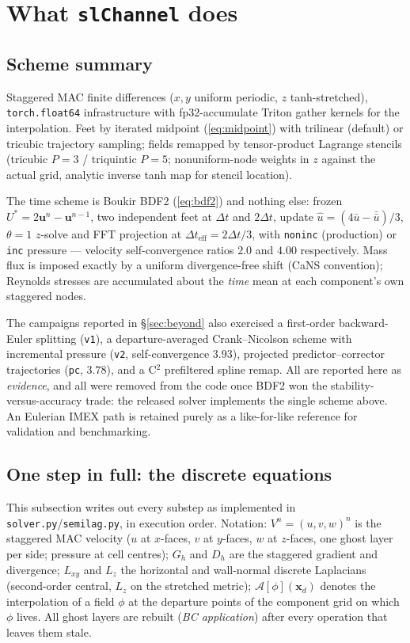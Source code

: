 \documentclass[11pt,a4paper]{article}
\newcommand{\bu}{\mathbf{u}}
\newcommand{\bx}{\mathbf{x}}
\begin{document}
\section{What \texttt{slChannel} does}

\subsection{Scheme summary}

Staggered MAC finite differences ($x,y$ uniform periodic, $z$
tanh-stretched), \texttt{torch.float64} infrastructure with fp32-accumulate
Triton gather kernels for the interpolation. Feet by iterated midpoint
(\ref{eq:midpoint}) with trilinear (default) or tricubic trajectory sampling;
fields remapped by tensor-product Lagrange stencils (tricubic $P{=}3$ /
triquintic $P{=}5$; nonuniform-node weights in $z$ against the actual grid,
analytic inverse tanh map for stencil location).

The time scheme is Boukir BDF2 (\ref{eq:bdf2}) and nothing else: frozen
$U^{*}=2\bu^{n}-\bu^{n-1}$, two independent feet at $\Delta t$ and
$2\Delta t$, update $\hat u = (4\bar u - \bar{\bar u})/3$, $\theta{=}1$
$z$-solve and FFT projection at $\Delta t_{\mathrm{eff}}=2\Delta t/3$, with
\texttt{noninc} (production) or \texttt{inc} pressure --- velocity
self-convergence ratios $2.0$ and $4.00$ respectively. Mass flux is imposed
exactly by a uniform divergence-free shift (CaNS convention); Reynolds
stresses are accumulated about the \emph{time} mean at each component's own
staggered nodes.

The campaigns reported in \S\ref{sec:beyond} also exercised a first-order
backward-Euler splitting (\texttt{v1}), a departure-averaged
Crank--Nicolson scheme with incremental pressure (\texttt{v2},
self-convergence $3.93$), projected predictor--corrector trajectories
(\texttt{pc}, $3.78$), and a C$^{2}$ prefiltered spline remap. All are
reported here as \emph{evidence}, and all were removed from the code once
BDF2 won the stability-versus-accuracy trade: the released solver implements
the single scheme above. An Eulerian IMEX path is retained purely as a
like-for-like reference for validation and benchmarking.

\subsection{One step in full: the discrete equations}
\label{sec:algorithm}

This subsection writes out every substep as implemented in
\texttt{solver.py}/\texttt{semilag.py}, in execution order. Notation:
$V^{n}=(u,v,w)^{n}$ is the staggered MAC velocity ($u$ at $x$-faces, $v$ at
$y$-faces, $w$ at $z$-faces, one ghost layer per side; pressure at cell
centres); $G_h$ and $D_h$ are the staggered gradient and divergence;
$L_{xy}$ and $L_z$ the horizontal and wall-normal discrete Laplacians
(second-order central, $L_z$ on the stretched metric); $\mathcal A[\phi](\bx_d)$
denotes the interpolation of a field $\phi$ at the departure points of the
component grid on which $\phi$ lives. All ghost layers are rebuilt
(\emph{BC application}) after every operation that leaves them stale.
\end{document}
